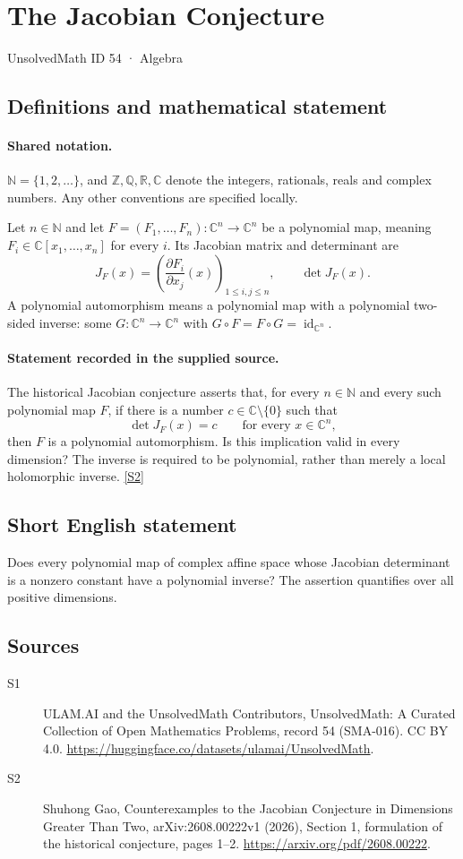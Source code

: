 \documentclass[11pt]{article}
\newcommand{\sref}[2]{\hyperlink{source:#1:#2}{[S#2]}}
\begin{document}
\setcounter{section}{53}
\section{The Jacobian Conjecture}\label{54}
{\small\sffamily UnsolvedMath ID 54 · Algebra}
\subsection{Definitions and mathematical statement}

\paragraph{Shared notation.}$\mathbb N=\{1,2,\ldots\}$, and $\mathbb Z,\mathbb Q,\mathbb R,\mathbb C$ denote the integers, rationals, reals and complex numbers. Any other conventions are specified locally.


Let $n\in\mathbb N$ and let $F=(F_1,\ldots,F_n):\mathbb C^n\to\mathbb C^n$ be a polynomial map, meaning $F_i\in\mathbb C[x_1,\ldots,x_n]$ for every $i$. Its Jacobian matrix and determinant are
\[
 J_F(x)=\left(\frac{\partial F_i}{\partial x_j}(x)\right)_{1\le i,j\le n},
 \qquad \det J_F(x).
\]
A polynomial automorphism means a polynomial map with a polynomial two-sided inverse: some $G:\mathbb C^n\to\mathbb C^n$ with $G\circ F=F\circ G=\operatorname{id}_{\mathbb C^n}$.
\paragraph{Statement recorded in the supplied source.}
The historical Jacobian conjecture asserts that, for every $n\in\mathbb N$ and every such polynomial map $F$, if there is a number $c\in\mathbb C\setminus\{0\}$ such that
\[
 \det J_F(x)=c\qquad\text{for every }x\in\mathbb C^n,
\]
then $F$ is a polynomial automorphism. Is this implication valid in every dimension? The inverse is required to be polynomial, rather than merely a local holomorphic inverse. \sref{54}{2}
\subsection{Short English statement}
Does every polynomial map of complex affine space whose Jacobian determinant is a nonzero constant have a polynomial inverse? The assertion quantifies over all positive dimensions.
\subsection{Sources}
\begin{description}
\item[\hypertarget{source:54:1}{S1}] ULAM.AI and the UnsolvedMath Contributors, UnsolvedMath: A Curated Collection of Open Mathematics Problems, record 54 (SMA-016). CC BY 4.0. \url{https://huggingface.co/datasets/ulamai/UnsolvedMath}.
\item[\hypertarget{source:54:2}{S2}] Shuhong Gao, Counterexamples to the Jacobian Conjecture in Dimensions Greater Than Two, arXiv:2608.00222v1 (2026), Section 1, formulation of the historical conjecture, pages 1--2. \url{https://arxiv.org/pdf/2608.00222}.
\end{description}
\label{end:54}
\end{document}
